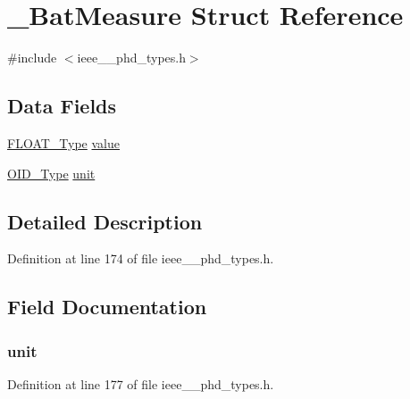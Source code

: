 \hypertarget{struct___bat_measure}{}\section{\+\_\+\+Bat\+Measure Struct Reference}
\label{struct___bat_measure}


{\ttfamily \#include $<$ieee\+\_\+\_\+phd\+\_\+types.\+h$>$}

\subsection*{Data Fields}
\begin{DoxyCompactItemize}
\item 
\hyperlink{ieee__11073__phd__types_8h_af070130e724f8e6babaa500f89591392}{F\+L\+O\+A\+T\+\_\+\+Type} \hyperlink{struct___bat_measure_ac7ab47e6d1990917b05d22ecaddb0a00}{value}
\item 
\hyperlink{ieee__11073__phd__types_8h_aa4d7af235d4a95d6632aa0d64160dd62}{O\+I\+D\+\_\+\+Type} \hyperlink{struct___bat_measure_a6384cd59b8433e034b6abc8fe5970171}{unit}
\end{DoxyCompactItemize}


\subsection{Detailed Description}


Definition at line 174 of file ieee\+\_\+\_\+phd\+\_\+types.\+h.



\subsection{Field Documentation}
\hypertarget{struct___bat_measure_a6384cd59b8433e034b6abc8fe5970171}{}
\subsubsection[{unit}]{ unit}\label{struct___bat_measure_a6384cd59b8433e034b6abc8fe5970171}


Definition at line 177 of file ieee\+\_\+\_\+phd\+\_\+types.\+h.

\hypertarget{struct___bat_measure_ac7ab47e6d1990917b05d22ecaddb0a00}{}
